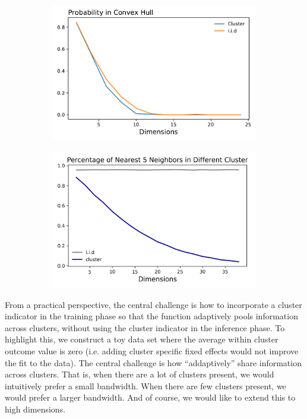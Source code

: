 \documentclass[a4paper,12pt]{article}
\begin{document}
\begin{figure}[htbp]
\centering
\begin{subfigure}{.48\textwidth}
    \centering
    \includegraphics[width=.95\linewidth]{figures/framework/iid_cluster.pdf}
    \caption{}
    \label{fig:higha}
\end{subfigure}
\begin{subfigure}{.48\textwidth}
    \centering
    \includegraphics[width=.95\linewidth]{figures/framework/nearest_neighbors_increasing_correlation.png}
    \caption{}
    \label{fig:highb}
\end{subfigure}
\caption{}
\label{fig:high}
\end{figure}



From a practical perspective, the central challenge is how to incorporate a cluster indicator in the training phase so that the function adaptively pools information across clusters, without using the cluster indicator in the inference phase. To highlight this, we construct a toy data set where the average within cluster outcome value is zero (i.e. adding cluster specific fixed effects would not improve the fit to the data). The central challenge is how ``addaptively'' share information across clusters. That is, when there are a lot of clusters present, we would intuitively prefer a small bandwidth. When there are few clusters present, we would prefer a larger bandwidth. And of course, we would like to extend this to high dimensions.
\end{document}

